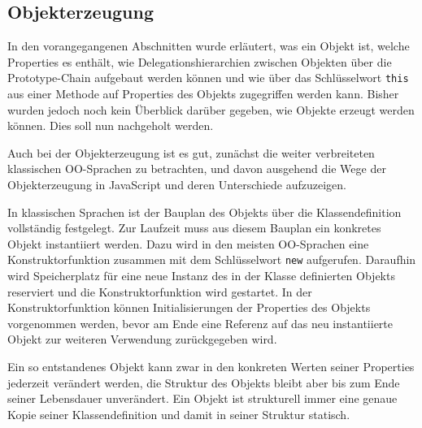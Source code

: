 \subsection{Objekterzeugung}\label{Objekterzeugung}

In den vorangegangenen Abschnitten wurde erläutert, was ein Objekt ist, welche Properties es enthält, wie Delegationshierarchien zwischen Objekten über die Prototype-Chain aufgebaut werden können und wie über das Schlüsselwort \texttt{this} aus einer Methode auf Properties des Objekts zugegriffen werden kann. Bisher wurden jedoch noch kein Überblick darüber gegeben, wie Objekte erzeugt werden können. Dies soll nun nachgeholt werden.


Auch bei der Objekterzeugung ist es gut, zunächst die weiter verbreiteten klassischen OO-Sprachen zu betrachten, und davon ausgehend die Wege der Objekterzeugung in JavaScript und deren Unterschiede aufzuzeigen.

In klassischen Sprachen ist der Bauplan des Objekts über die Klassendefinition vollständig festgelegt. Zur Laufzeit muss aus diesem Bauplan ein konkretes Objekt instantiiert werden. Dazu wird in den meisten OO-Sprachen eine Konstruktorfunktion zusammen mit dem Schlüsselwort \texttt{new} aufgerufen. Daraufhin wird Speicherplatz für eine neue Instanz des in der Klasse definierten Objekts reserviert und die Konstruktorfunktion wird gestartet. In der Konstruktorfunktion können Initialisierungen der Properties des Objekts vorgenommen werden, bevor am Ende eine Referenz auf das neu instantiierte Objekt zur weiteren Verwendung zurückgegeben wird.

Ein so entstandenes Objekt kann zwar in den konkreten Werten seiner Properties jederzeit verändert werden, die Struktur des Objekts bleibt aber bis zum Ende seiner Lebensdauer unverändert. Ein Objekt ist strukturell immer eine genaue Kopie seiner Klassendefinition und damit in seiner Struktur statisch.

\skippingparagraph


